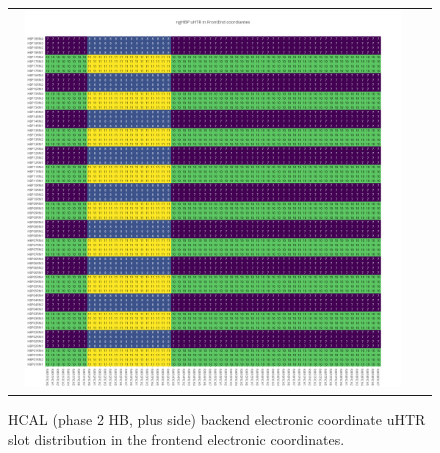 \begin{figure}[htb]
 \begin{center}
  \begin{tabular}{cc}
   \includegraphics[angle=0,width=0.95\textwidth]{figures/appendix/ngHBP_uHTR_in_FrontEnd.png}
  \end{tabular}
  \caption{HCAL (phase 2 HB, plus side) backend electronic coordinate uHTR slot distribution in the frontend electronic coordinates.}
  \label{fig:lmapngHBPuHTRFEC}
 \end{center}
\end{figure}
\clearpage

